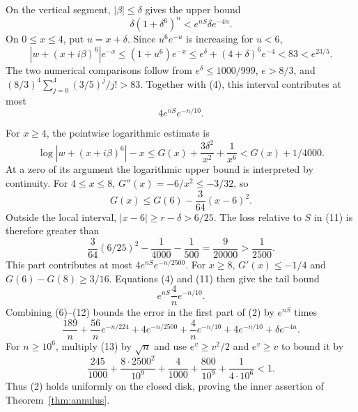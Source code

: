 \documentclass[11pt]{article}
\begin{document}
On the vertical segment, $|\beta|\le\delta$ gives the upper bound
\[
 \delta(1+\delta^6)^n<e^{nS}\delta e^{-4n}.             \tag{9}
\]
On $0\le x\le4$, put $u=x+\delta$. Since $u^6e^{-u}$ is increasing for
$u<6$,
\[
 |w+(x+i\beta)^6|e^{-x}
 \le (1+u^6)e^{-x}
 \le e^\delta+(4+\delta)^6e^{-4}<83<e^{23/5}.
\]
The two numerical comparisons follow from $e^\delta\le1000/999$,
$e>8/3$, and
$(8/3)^4\sum_{j=0}^4(3/5)^j/j!>83$.
Together with (4), this interval contributes at most
\[
                         4e^{nS}e^{-n/10}.             \tag{10}
\]

For $x\ge4$, the pointwise logarithmic estimate is
\[
 \log|w+(x+i\beta)^6|-x
 \le G(x)+\frac{3\delta^2}{x^2}+\frac1{x^6}
 <G(x)+1/4000.                                        \tag{11}
\]
At a zero of its argument the logarithmic upper bound is interpreted by
continuity. For $4\le x\le8$, $G''(x)=-6/x^2\le-3/32$, so
\[
 G(x)\le G(6)-\frac3{64}(x-6)^2.
\]
Outside the local interval, $|x-6|\ge r-\delta>6/25$.
The loss relative to $S$ in (11) is therefore greater than
\[
 \frac3{64}(6/25)^2-\frac1{4000}-\frac1{500}
 =\frac9{20000}>\frac1{2500}.
\]
This part contributes at most $4e^{nS}e^{-n/2500}$.
For $x\ge8$, $G'(x)\le-1/4$ and
$G(6)-G(8)\ge3/16$. Equations (4) and (11) then give the tail bound
\[
                   e^{nS}\frac4n e^{-n/10}.            \tag{12}
\]
Combining (6)--(12) bounds the error in the first part of (2) by $e^{nS}$
times
\[
 \frac{189}{n}+\frac{56}{n}e^{-n/224}
 +4e^{-n/2500}+\frac4n e^{-n/10}+4e^{-n/10}
 +\delta e^{-4n}.                                     \tag{13}
\]
For $n\ge10^6$, multiply (13) by $\sqrt n$ and use
$e^v\ge v^2/2$ and $e^v\ge v$ to bound it by
\[
 \frac{245}{1000}
 +\frac{8\cdot2500^2}{10^9}
 +\frac4{1000}+\frac{800}{10^9}
 +\frac1{4\cdot10^6}<1.
\]
Thus (2) holds uniformly on the closed disk, proving the inner assertion
of Theorem~\ref{thm:annulus}.
\end{document}
